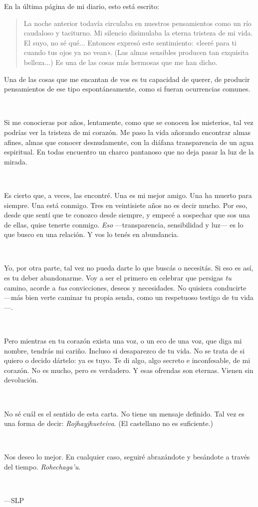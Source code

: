 \documentclass[a4paper, 12pt]{article}
\begin{document}
En la última página de mi diario, esto está escrito:

\begin{quote}
La noche anterior todavía circulaba en nuestros pensamientos como un río
caudaloso y taciturno. Mi silencio disimulaba la eterna tristeza de mi vida. El
suyo, no sé qué... Entonces expresó este sentimiento: «leeré para ti cuando tus
ojos ya no vean». (Las almas sensibles producen tan exquisita belleza...)
Es una de las cosas más hermosas que me han dicho.
\end{quote}

Una de las cosas que me encantan de vos es tu capacidad de querer, de producir
pensamientos de ese tipo espontáneamente, como si fueran ocurrencias comunes. 

~

Si me conocieras por años, lentamente, como que se conocen los misterios, tal
vez podrías ver la tristeza de mi corazón. Me paso la vida añorando encontrar
almas afines, almas que conocer desnudamente, con la diáfana transparencia de un
agua espiritual. En todas encuentro un charco pantanoso que no deja pasar la luz
de la mirada.

~ 

Es cierto que, a veces, las encontré. Una es mi mejor amigo. Una ha muerto para
siempre. Una está conmigo. Tres en veintisiete años no es decir mucho. Por eso,
desde que sentí que te conozco desde siempre, y empecé a sospechar que sos una
de ellas, quise tenerte conmigo. \textit{Eso} ---transparencia, sensibilidad y
luz--- es lo que busco en una relación. Y vos lo tenés en abundancia.

~ 

Yo, por otra parte, tal vez no pueda darte lo que buscás o necesitás. Si eso es
así, es tu deber abandonarme. Voy a ser el primero en celebrar que persigas
\textit{tu} camino, acorde a \textit{tus} convicciones, deseos y necesidades. No
quisiera conducirte ---más bien verte caminar tu propia senda, como un
respetuoso testigo de tu vida---.

~ 

Pero mientras en tu corazón exista una voz, o un eco de una voz, que diga mi
nombre, tendrás mi cariño. Incluso si desaparezco de tu vida. No se trata de si
quiero o decido dártelo: ya es tuyo. Te di algo, algo secreto e inconfesable, de
mi corazón. No es mucho, pero es verdadero. Y esas ofrendas son eternas. Vienen
sin devolución.

~
~ 

No sé cuál es el sentido de esta carta. No tiene un mensaje definido. Tal vez
es una forma de decir: \textit{Rojhayjhueteiva}. (El castellano no es suficiente.)

~ 

Nos deseo lo mejor. En cualquier caso, seguiré abrazándote y besándote a través
del tiempo. \textit{Rohechaga'u}.

~

---SLP
\end{document}
